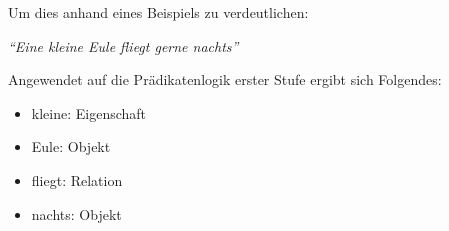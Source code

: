 Um dies anhand eines Beispiels zu verdeutlichen:

    \noindent\hspace*{12mm}\textit{``Eine kleine Eule fliegt gerne nachts''}

Angewendet auf die Prädikatenlogik erster Stufe ergibt sich Folgendes:

\begin{itemize}
    \item{kleine: Eigenschaft}
    \item{Eule: Objekt}
    \item{fliegt: Relation}
    \item{nachts: Objekt}
\end{itemize}





